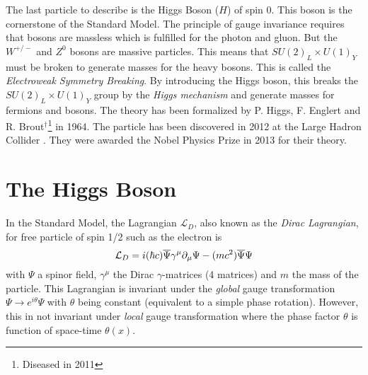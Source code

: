 The last particle to describe is the Higgs Boson ($H$) of spin 0. This boson is the cornerstone of the Standard Model. The principle of gauge invariance requires that bosons are massless which is fulfilled for the photon and gluon. But the $W^{+/-}$ and $Z^0$ bosons are massive particles. This means that $SU(2)_{L} \times U(1)_{Y}$ must be broken to generate masses for the heavy bosons. This is called the \textit{Electroweak Symmetry Breaking}. By introducing the Higgs boson, this breaks the $SU(2)_{L} \times U(1)_{Y}$ group by the \textit{Higgs mechanism} and generate masses for fermions and bosons. The theory \cite{Higgs:1964pj, Englert:1964et} has been formalized by P. Higgs, F. Englert and R. Brout$^\dagger$\footnote{Diseased in 2011} in 1964. The particle has been discovered in 2012 at the Large Hadron Collider \cite{Aad:2012tfa, Chatrchyan:2012xdj}. They were awarded the Nobel Physics Prize in 2013 for their theory.

\section{The Higgs Boson}
\label{sec:HiggsTheo}

In the Standard Model, the Lagrangian $\mathcal{L}_{D}$, also known as the \textit{Dirac Lagrangian}, for free particle of spin 1/2 such as the electron is \cite{Griffiths:343277}
\begin{equation}
  \mathcal{L}_{D} = i(\hbar c)\overline{\rm \Psi}\gamma^{\mu}\partial_{\mu}\Psi - (mc^2)\overline{\rm \Psi}\Psi
\end{equation}
with $\Psi$ a spinor field, $\gamma^{\mu}$ the Dirac $\gamma$-matrices (4 matrices) \cite{Peskin:1995ev} and $m$ the mass of the particle. This Lagrangian is invariant under the \textit{global} gauge transformation $\Psi \rightarrow e^{i\theta}\Psi$ with $\theta$ being constant (equivalent to a simple phase rotation). However, this in not invariant under \textit{local} gauge transformation where the phase factor $\theta$ is function of space-time $\theta(x)$.

